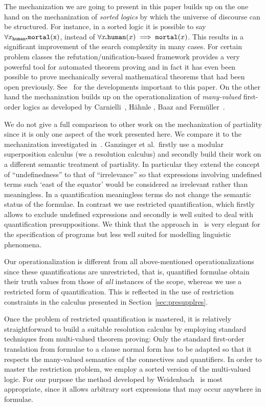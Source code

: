 \documentclass{\filespath jancl}
\def\sdot{\rule{.3ex}{.3ex}\hspace{-0.4ex}\;}
\newcommand{\all}[3]{\forall {#1}_{#2}\sdot #3}
\begin{document}
The mechanization we are going to present in this paper builds up on
the one hand on the mechanization of \textit{sorted logics} by which
the universe of discourse can be structured.  For instance, in a
sorted logic it is possible to say $\all{x}{{\tt human}}{\tt
  mortal}(x)$, instead of $\forall x\sdot {\tt human}(x) \implies {\tt
  mortal}(x)$. This results in a significant improvement of the search
complexity in many cases.  For certain problem classes the
refutation/unification-based framework provides a very powerful tool
for automated theorem proving and in fact it has even been possible to
prove mechanically several mathematical theorems that had been open
previously.  See~\cite{WeGaRo:sfv96,WeiSchHil:Spass07} for the developments important to
this paper. On the other hand the mechanization builds up on the
operationalization of \textit{many-valued} first-order logics as
developed by Carnielli~\cite{Carnielli87}, H\"ahnle
\cite{Haehnle:adimvl94}, Baaz and Ferm\"uller~\cite{BaFe92}.

We do not give a full comparison to other work on the mechanization of
partiality since it is only one aspect of the work presented here. We
compare it to the mechanization investigated
in~\cite{GaSoWa06}. Ganzinger et al.\ firstly use a modular
superposition calculus (we a resolution calculus) and secondly build
their work on a different semantic treatment of partiality. In
particular they extend the concept of ``undefinedness'' to that of
``irrelevance'' so that expressions involving undefined terms such
`east of the equator' would be considered as irrelevant rather than
meaningless. In a quantification meaningless terms do
not change the semantic status of the formulae.  In contrast we use
restricted quantification, which firstly allows to exclude undefined
expressions and secondly is well suited to deal with quantification
presuppositions.  We think that the approach in~\cite{GaSoWa06} is
very elegant for the specification of programs but less well suited
for modelling linguistic phenomena.

Our operationalization is different from all above-mentioned
operationalizations since these quantifications are unrestricted, that
is, quantified formulae obtain their truth values from those of {\em
  all\/} instances of the scope, whereas we use a restricted form of
quantification.  This is reflected in the use of restriction
constraints in the calculus presented in Section~\ref{sec:presupplres}.

Once the problem of restricted quantification is mastered, it is
relatively straightforward to build a suitable resolution calculus by
employing standard techniques from multi-valued theorem proving: Only
the standard first-order translation from formulae to a clause normal
form has to be adapted so that it respects the many-valued semantics
of the connectives and quantifiers. In order to master the restriction
problem, we employ a sorted version of the multi-valued logic.  For
our purpose the method developed by
Weidenbach~\cite{Weidenbach91,Weidenbach:cafols96} is most
appropriate, since it allows arbitrary sort expressions that may occur
anywhere in formulae.
\end{document}
